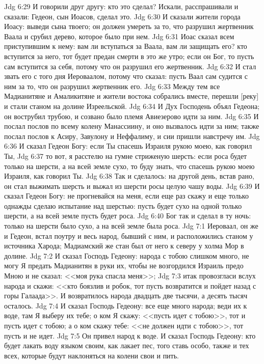 \vs Jdg 6:29 И говорили друг другу: кто это сделал? Искали, расспрашивали и сказали: Гедеон, сын Иоасов, сделал это.
\vs Jdg 6:30 И сказали жители города Иоасу: выведи сына твоего; он должен умереть за то, что разрушил жертвенник Ваала и срубил дерево, которое было при нем.
\vs Jdg 6:31 Иоас сказал всем приступившим к нему: вам ли вступаться за Ваала, вам ли защищать его? кто вступится за него, тот будет предан смерти в это же утро; если он Бог, то пусть сам вступится за себя, потому что он разрушил его жертвенник.
\vs Jdg 6:32 И стал звать его с того дня Иероваалом, потому что сказал: пусть Ваал сам судится с ним за то, что он разрушил жертвенник его.
\vs Jdg 6:33 Между тем все Мадианитяне и Амаликитяне и жители востока собрались вместе, перешли [реку] и стали станом на долине Изреельской.
\vs Jdg 6:34 И Дух Господень объял Гедеона; он вострубил трубою, и созвано было племя Авиезерово идти за ним.
\vs Jdg 6:35 И послал послов по всему колену Манассиину, и оно вызвалось идти за ним; также послал послов к Асиру, Завулону и Неффалиму, и сии пришли навстречу им.
\vs Jdg 6:36 И сказал Гедеон Богу: если Ты спасешь Израиля рукою моею, как говорил Ты,
\vs Jdg 6:37 то вот, я расстелю  на гумне стриженую шерсть: если роса будет только на шерсти, а на всей земле сухо, то буду знать, что спасешь рукою моею Израиля, как говорил Ты.
\vs Jdg 6:38 Так и сделалось: на другой день, встав рано, он стал выжимать шерсть и выжал из шерсти росы целую чашу воды.
\vs Jdg 6:39 И сказал Гедеон Богу: не прогневайся на меня, если еще раз скажу и еще только однажды сделаю испытание над шерстью: пусть будет сухо на одной только шерсти, а на всей земле пусть будет роса.
\vs Jdg 6:40 Бог так и сделал в ту ночь: только на шерсти было сухо, а на всей земле была роса.
\vs Jdg 7:1 Иероваал, он же и Гедеон, встал поутру и весь народ, бывший с ним, и расположились станом у источника Харода; Мадиамский же стан был от него к северу у холма Мор в долине.
\vs Jdg 7:2 И сказал Господь Гедеону: народа с тобою слишком много, не могу Я предать Мадианитян в руки их, чтобы не возгордился Израиль предо Мною и не сказал: <<моя рука спасла меня>>;
\vs Jdg 7:3 итак провозгласи вслух народа и скажи: <<кто боязлив и робок, тот пусть возвратится и пойдет назад с горы Галаада>>. И возвратилось народа двадцать две тысячи, а десять тысяч осталось.
\vs Jdg 7:4 И сказал Господь Гедеону: все еще много народа; веди их к воде, там Я выберу их тебе; о ком Я скажу: <<пусть идет с тобою>>, тот и пусть идет с тобою; а о ком скажу тебе: <<не должен идти с тобою>>, тот пусть и не идет.
\vs Jdg 7:5 Он привел народ к воде. И сказал Господь Гедеону: кто будет лакать воду языком своим, как лакает пес, того ставь особо, также и тех всех, которые будут наклоняться на колени свои и пить.

